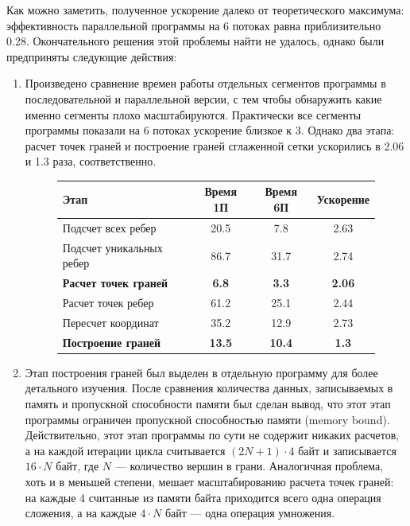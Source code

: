 \documentclass[14pt]{extarticle}
\begin{document}
Как можно заметить, полученное ускорение далеко от теоретического максимума: эффективность параллельной программы на 6 потоках равна приблизительно 0.28. Окончательного решения этой проблемы найти не удалось, однако были предприняты следующие действия:
\begin{enumerate}
    \item Произведено сравнение времен работы отдельных сегментов программы в последовательной и параллельной версии, с тем чтобы обнаружить какие именно сегменты плохо масштабируются. Практически все сегменты программы показали на 6 потоках ускорение близкое к 3. Однако два этапа: расчет точек граней и построение граней сглаженной сетки ускорились в 2.06 и 1.3 раза, соответственно.
        \begin{figure}[H]
            \centering
        \begin{tabular}{|l | c | c | c |}
            Этап & Время 1П & Время 6П & Ускорение \\
            \hline
            Подсчет всех ребер & 20.5 & 7.8 & 2.63 \\
            Подсчет уникальных ребер & 86.7 & 31.7 & 2.74 \\
            \textbf{Расчет точек граней} & \textbf{6.8} & \textbf{3.3} & \textbf{2.06} \\
            Расчет точек ребер & 61.2 & 25.1 & 2.44 \\
            Пересчет координат & 35.2 & 12.9 & 2.73 \\
            \textbf{Построение граней} & \textbf{13.5} & \textbf{10.4} & \textbf{1.3} \\
    \end{tabular}
        \end{figure}
    \item Этап построения граней был выделен в отдельную программу для более детального изучения. После сравнения количества данных, записываемых в память и пропускной способности памяти был сделан вывод, что этот этап программы ограничен пропускной способностью памяти (memory bound). Действительно, этот этап программы по сути не содержит никаких расчетов, а на каждой итерации цикла считывается $(2N + 1) \cdot 4$ байт и записывается $16 \cdot N$ байт, где $N$ ---
        количество вершин в грани. Аналогичная проблема, хоть и в меньшей степени, мешает масштабированию расчета точек граней: на каждые 4 считанные из памяти байта приходится всего одна операция сложения, а на каждые $4 \cdot N$ байт --- одна операция умножения.

\end{enumerate}
\end{document}
